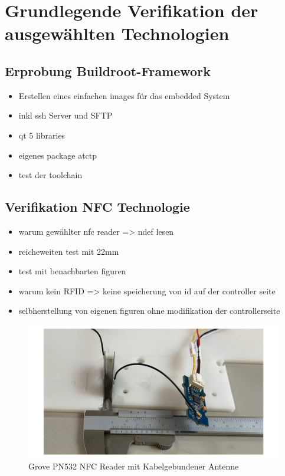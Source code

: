 \hypertarget{grundlegende-verifikation-der-ausgewuxe4hlten-technologien}{%
\chapter{Grundlegende Verifikation der ausgewählten
Technologien}\label{grundlegende-verifikation-der-ausgewuxe4hlten-technologien}}

\hypertarget{erprobung-buildroot-framework}{%
\section{Erprobung
Buildroot-Framework}\label{erprobung-buildroot-framework}}

\begin{itemize}
\tightlist
\item
  Erstellen eines einfachen images für das embedded System
\item
  inkl ssh Server und SFTP
\item
  qt 5 libraries
\item
  eigenes package atctp
\item
  test der toolchain
\end{itemize}

\hypertarget{verifikation-nfc-technologie}{%
\section{Verifikation NFC
Technologie}\label{verifikation-nfc-technologie}}

\begin{itemize}
\tightlist
\item
  warum gewählter nfc reader =\textgreater{} ndef lesen
\item
  reicheweiten test mit 22mm
\item
  test mit benachbarten figuren
\item
  warum kein RFID =\textgreater{} keine speicherung von id auf der
  controller seite
\item
  selbherstellung von eigenen figuren ohne modifikation der
  controllerseite
\end{itemize}

\begin{figure}
\centering
\includegraphics{images/ATC_nfc_range_test.png}
\caption{Grove PN532 NFC Reader mit Kabelgebundener Antenne
\label{ATC_nfc_range_test}}
\end{figure}

